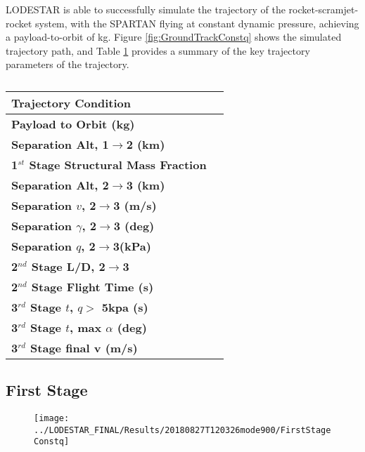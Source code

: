 LODESTAR is able to successfully simulate the trajectory of the rocket-scramjet-rocket system, with the SPARTAN flying at constant dynamic pressure, achieving a payload-to-orbit of \PayloadToOrbitConstq kg.
Figure \ref{fig:GroundTrackConstq} shows the simulated trajectory path, and Table \ref{tab:constqsummary} provides a summary of the key trajectory parameters of the trajectory. 



\begin{table}[ht]
	\centering
	

\begin{tabular}{l c} 
	\hline \textbf{Trajectory Condition}
	&
	\\
	\hline \textbf{Payload to Orbit (kg)}
	& \PayloadToOrbitConstq
	\\
	\textbf{Separation Alt, 1$\rightarrow$2 (km)}
	& \firstsecondSeparationAltConstq
	\\
	\textbf{1$^{st}$ Stage Structural Mass Fraction}
	& \FirstStageSMFConstq
	\\
	\textbf{Separation Alt, 2$\rightarrow$3 (km)}
	& \secondthirdSeparationAltConstq
	\\
	\textbf{Separation $v$, 2$\rightarrow$3 (m/s)}
	& \secondthirdSeparationvConstq
	\\
	\textbf{Separation $\gamma$, 2$\rightarrow$3 (deg)}
	& \secondthirdSeparationgammaConstq
	\\
	\textbf{Separation $q$, 2$\rightarrow$3(kPa)}
	& \secondthirdSeparationqConstq
	\\
	\textbf{2$^{nd}$ Stage L/D, 2$\rightarrow$3}
	& \secondthirdSeparationLDConstq
	\\
	\textbf{2$^{nd}$ Stage Flight Time (s)}
	& \secondFlightTimeConstq
	\\
	\textbf{3$^{rd}$ Stage $t$, $q >$ 5kpa (s)}
	& \thirdqOverFiveConstq
	\\
	\textbf{3$^{rd}$ Stage $t$, max $\alpha$ (deg)}
	& \thirdmaxAoAConstq
	\\
	\textbf{3$^{rd}$ Stage final v (m/s)}
	& \thirdcircvConstq
	\\
	\hline 
\end{tabular} 
\caption{}
\label{tab:constqsummary}
\end{table}





\subsection{First Stage}
\begin{figure}[ht]
\centering
\texttt{[image: ../LODESTAR\_FINAL/Results/20180827T120326mode900/FirstStageConstq]}
\caption{}
\label{fig:FirstStageConstq}
\end{figure}

